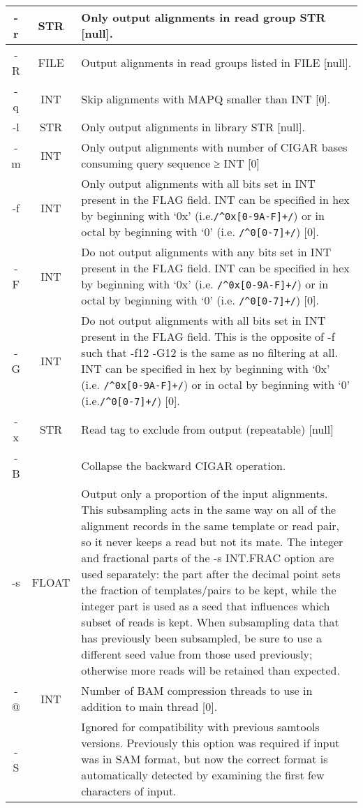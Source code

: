 \begin{longtable}{|c|c|p{}|}
	-r & STR & Only output alignments in read group STR [null]. \\ \hline
	-R & FILE & Output alignments in read groups listed in FILE [null]. \\ \hline
	-q & INT & Skip alignments with MAPQ smaller than INT [0]. \\ \hline
	-l & STR & Only output alignments in library STR [null]. \\ \hline
	-m & INT & Only output alignments with number of CIGAR bases consuming query sequence ≥ INT [0] \\ \hline
	-f & INT & Only output alignments with all bits set in INT present in the FLAG field. INT can be specified in hex by beginning with `0x' (i.e.\verb|/^0x[0-9A-F]+/|) or in octal by beginning with `0' (i.e. \verb|/^0[0-7]+/|) [0]. \\ \hline
	-F & INT & Do not output alignments with any bits set in INT present in the FLAG field. INT can be specified in hex by beginning with `0x' (i.e. \verb|/^0x[0-9A-F]+/|) or in octal by beginning with `0' (i.e. \verb|/^0[0-7]+/|) [0]. \\ \hline
	-G & INT & Do not output alignments with all bits set in INT present in the FLAG field. This is the opposite of -f such that -f12 -G12 is the same as no filtering at all. INT can be specified in hex by beginning with `0x' (i.e. \verb|/^0x[0-9A-F]+/|) or in octal by beginning with `0' (i.e.\verb|/^0[0-7]+/|) [0]. \\ \hline
	-x & STR & Read tag to exclude from output (repeatable) [null] \\ \hline
	-B & & Collapse the backward CIGAR operation. \\ \hline
	-s & FLOAT & Output only a proportion of the input alignments. This subsampling acts in the same way on all of the alignment records in the same template or read pair, so it never keeps a read but not its mate. 
	The integer and fractional parts of the -s INT.FRAC option are used separately: the part after the decimal point sets the fraction of templates/pairs to be kept, while the integer part is used as a seed that influences which subset of reads is kept. 
	When subsampling data that has previously been subsampled, be sure to use a different seed value from those used previously; otherwise more reads will be retained than expected.  \\ \hline
	-@ & INT & Number of BAM compression threads to use in addition to main thread [0]. \\ \hline
	-S & & Ignored for compatibility with previous samtools versions. Previously this option was required if input was in SAM format, but now the correct format is automatically detected by examining the first few characters of input. \\ \hline
\end{longtable}

